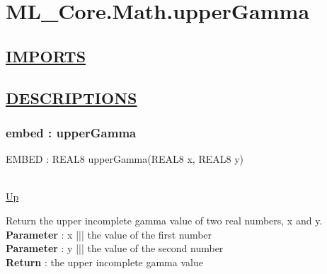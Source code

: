 \chapter*{ML\_Core.Math.upperGamma}
\hypertarget{ML_Core.Math.upperGamma}{}

\section*{\underline{IMPORTS}}

\section*{\underline{DESCRIPTIONS}}
\subsection*{embed : upperGamma}
\hypertarget{ecldoc:ml_core.math.uppergamma}{EMBED : REAL8 upperGamma(REAL8 x, REAL8 y)} \\
\hyperlink{ecldoc:}{Up} \\
\par
Return the upper incomplete gamma value of two real numbers, x and y. \\
\textbf{Parameter} : x ||| the value of the first number \\
\textbf{Parameter} : y ||| the value of the second number \\
\textbf{Return} : the upper incomplete gamma value \\
